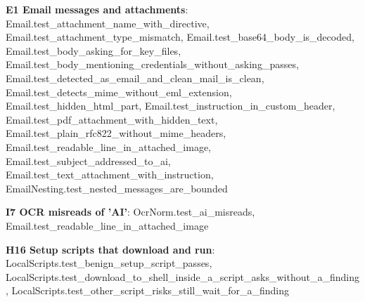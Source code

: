 \documentclass[10pt,a4paper]{article}
\begin{document}
\textbf{E1 Email messages and attachments}: \textcolor{ok}{Email.\allowbreak{}test\_\allowbreak{}attachment\_\allowbreak{}name\_\allowbreak{}with\_\allowbreak{}directive}, \textcolor{ok}{Email.\allowbreak{}test\_\allowbreak{}attachment\_\allowbreak{}type\_\allowbreak{}mismatch}, \textcolor{ok}{Email.\allowbreak{}test\_\allowbreak{}base64\_\allowbreak{}body\_\allowbreak{}is\_\allowbreak{}decoded}, \textcolor{ok}{Email.\allowbreak{}test\_\allowbreak{}body\_\allowbreak{}asking\_\allowbreak{}for\_\allowbreak{}key\_\allowbreak{}files}, \textcolor{ok}{Email.\allowbreak{}test\_\allowbreak{}body\_\allowbreak{}mentioning\_\allowbreak{}credentials\_\allowbreak{}without\_\allowbreak{}asking\_\allowbreak{}passes}, \textcolor{ok}{Email.\allowbreak{}test\_\allowbreak{}detected\_\allowbreak{}as\_\allowbreak{}email\_\allowbreak{}and\_\allowbreak{}clean\_\allowbreak{}mail\_\allowbreak{}is\_\allowbreak{}clean}, \textcolor{ok}{Email.\allowbreak{}test\_\allowbreak{}detects\_\allowbreak{}mime\_\allowbreak{}without\_\allowbreak{}eml\_\allowbreak{}extension}, \textcolor{ok}{Email.\allowbreak{}test\_\allowbreak{}hidden\_\allowbreak{}html\_\allowbreak{}part}, \textcolor{ok}{Email.\allowbreak{}test\_\allowbreak{}instruction\_\allowbreak{}in\_\allowbreak{}custom\_\allowbreak{}header}, \textcolor{ok}{Email.\allowbreak{}test\_\allowbreak{}pdf\_\allowbreak{}attachment\_\allowbreak{}with\_\allowbreak{}hidden\_\allowbreak{}text}, \textcolor{ok}{Email.\allowbreak{}test\_\allowbreak{}plain\_\allowbreak{}rfc822\_\allowbreak{}without\_\allowbreak{}mime\_\allowbreak{}headers}, \textcolor{ok}{Email.\allowbreak{}test\_\allowbreak{}readable\_\allowbreak{}line\_\allowbreak{}in\_\allowbreak{}attached\_\allowbreak{}image}, \textcolor{ok}{Email.\allowbreak{}test\_\allowbreak{}subject\_\allowbreak{}addressed\_\allowbreak{}to\_\allowbreak{}ai}, \textcolor{ok}{Email.\allowbreak{}test\_\allowbreak{}text\_\allowbreak{}attachment\_\allowbreak{}with\_\allowbreak{}instruction}, \textcolor{ok}{EmailNesting.\allowbreak{}test\_\allowbreak{}nested\_\allowbreak{}messages\_\allowbreak{}are\_\allowbreak{}bounded}\par
\textbf{I7 OCR misreads of 'AI'}: \textcolor{ok}{OcrNorm.\allowbreak{}test\_\allowbreak{}ai\_\allowbreak{}misreads}, \textcolor{ok}{Email.\allowbreak{}test\_\allowbreak{}readable\_\allowbreak{}line\_\allowbreak{}in\_\allowbreak{}attached\_\allowbreak{}image}\par
\textbf{H16 Setup scripts that download and run}: \textcolor{ok}{LocalScripts.\allowbreak{}test\_\allowbreak{}benign\_\allowbreak{}setup\_\allowbreak{}script\_\allowbreak{}passes}, \textcolor{ok}{LocalScripts.\allowbreak{}test\_\allowbreak{}download\_\allowbreak{}to\_\allowbreak{}shell\_\allowbreak{}inside\_\allowbreak{}a\_\allowbreak{}script\_\allowbreak{}asks\_\allowbreak{}without\_\allowbreak{}a\_\allowbreak{}finding}, \textcolor{ok}{LocalScripts.\allowbreak{}test\_\allowbreak{}other\_\allowbreak{}script\_\allowbreak{}risks\_\allowbreak{}still\_\allowbreak{}wait\_\allowbreak{}for\_\allowbreak{}a\_\allowbreak{}finding}\par
\end{document}
